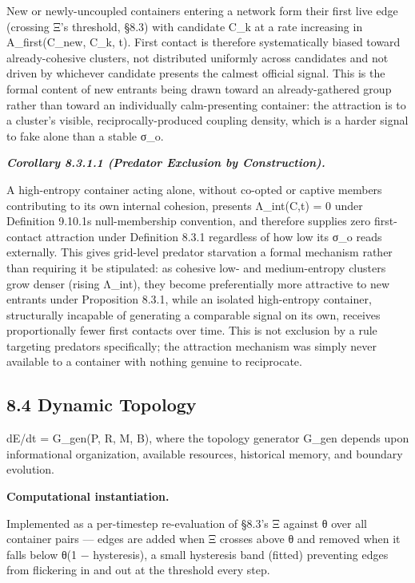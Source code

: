 \documentclass[
]{article}
\begin{document}
New or newly-uncoupled containers entering a network form their first
live edge (crossing Ξ's threshold, §8.3) with candidate C\_k at a rate
increasing in A\_first(C\_new, C\_k, t). First contact is therefore
systematically biased toward already-cohesive clusters, not distributed
uniformly across candidates and not driven by whichever candidate
presents the calmest official signal. This is the formal content of new
entrants being drawn toward an already-gathered group rather than toward
an individually calm-presenting container: the attraction is to a
cluster's visible, reciprocally-produced coupling density, which is a
harder signal to fake alone than a stable σ\_o.

\emph{\textbf{Corollary 8.3.1.1 (Predator Exclusion by Construction).}}

A high-entropy container acting alone, without co-opted or captive
members contributing to its own internal cohesion, presents Λ\_int(C,t)
= 0 under Definition 9.10.1\textquotesingle s null-membership
convention, and therefore supplies zero first-contact attraction under
Definition 8.3.1 regardless of how low its σ\_o reads externally. This
gives grid-level predator starvation a formal mechanism rather than
requiring it be stipulated: as cohesive low- and medium-entropy clusters
grow denser (rising Λ\_int), they become preferentially more attractive
to new entrants under Proposition 8.3.1, while an isolated high-entropy
container, structurally incapable of generating a comparable signal on
its own, receives proportionally fewer first contacts over time. This is
not exclusion by a rule targeting predators specifically; the attraction
mechanism was simply never available to a container with nothing genuine
to reciprocate.

\hypertarget{dynamic-topology}{%
\subsection{8.4 Dynamic Topology}\label{dynamic-topology}}

dE/dt = G\_gen(P, R, M, B), where the topology generator G\_gen depends
upon informational organization, available resources, historical memory,
and boundary evolution.

\textbf{Computational instantiation.}

Implemented as a per-timestep re-evaluation of §8.3's Ξ against θ over
all container pairs --- edges are added when Ξ crosses above θ and
removed when it falls below θ(1 − hysteresis), a small hysteresis band
(fitted) preventing edges from flickering in and out at the threshold
every step.
\end{document}
